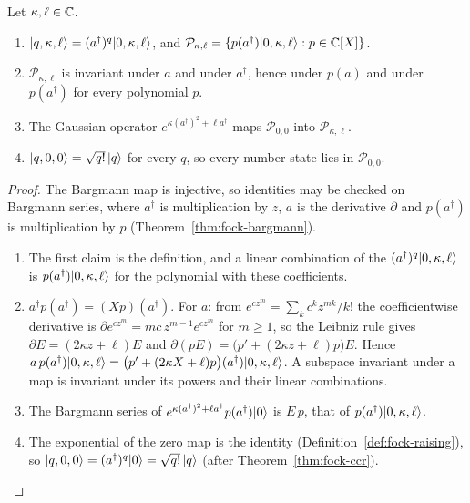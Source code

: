 \begin{vetbenv}
\begin{lemma}\label{lem:fock-photon}
Let $\kappa,\ell\in\mathbb C$.
\begin{enumerate}
\item[(a)] $\lvert q,\kappa,\ell\rangle=(a^\dagger)^q\lvert 0,\kappa,\ell\rangle$, and $\mathcal P_{\kappa,\ell}=\{p(a^\dagger)
\lvert 0,\kappa,\ell\rangle:p\in\mathbb C[X]\}$.
\item[(b)] $\mathcal P_{\kappa,\ell}$ is invariant under $a$ and under $a^\dagger$, hence under $p(a)$ and
under $p(a^\dagger)$ for every polynomial $p$.
\item[(c)] The Gaussian operator $e^{\kappa(a^\dagger)^2+\ell a^\dagger}$ maps $\mathcal P_{0,0}$ into
$\mathcal P_{\kappa,\ell}$.
\item[(d)] $\lvert q,0,0\rangle=\sqrt{q!}\,\lvert q\rangle$ for every $q$, so every number state lies in $\mathcal P_{0,0}$.
\end{enumerate}
\end{lemma}

\begin{proof}
The Bargmann map is injective, so identities may be checked on Bargmann series, where $a^\dagger$ is
multiplication by $z$, $a$ is the derivative $\partial$ and $p(a^\dagger)$ is multiplication by $p$
(Theorem~\ref{thm:fock-bargmann}).
\begin{enumerate}
\item[(a)] The first claim is the definition, and a linear combination of the $(a^\dagger)^q\lvert 0,\kappa,
\ell\rangle$ is $p(a^\dagger)\lvert 0,\kappa,\ell\rangle$ for the polynomial with these coefficients.
\item[(b)] $a^\dagger p(a^\dagger)=(Xp)(a^\dagger)$. For $a$: from $e^{cz^m}=\sum_kc^kz^{mk}/k!$ the
coefficientwise derivative is $\partial e^{cz^m}=mc\,z^{m-1}e^{cz^m}$ for $m\ge1$, so the Leibniz rule gives
$\partial E=(2\kappa z+\ell)E$ and $\partial(pE)=\bigl(p'+(2\kappa z+\ell)p\bigr)E$. Hence $a\,p(a^\dagger)
\lvert 0,\kappa,\ell\rangle=\bigl(p'+(2\kappa X+\ell)p\bigr)(a^\dagger)\lvert 0,\kappa,\ell\rangle$. A subspace invariant under
a map is invariant under its powers and their linear combinations.
\item[(c)] The Bargmann series of $e^{\kappa(a^\dagger)^2+\ell a^\dagger}p(a^\dagger)\lvert 0\rangle$ is $E\,p$, that of
$p(a^\dagger)\lvert 0,\kappa,\ell\rangle$.
\item[(d)] The exponential of the zero map is the identity (Definition~\ref{def:fock-raising}), so
$\lvert q,0,0\rangle=(a^\dagger)^q\lvert 0\rangle=\sqrt{q!}\,\lvert q\rangle$ (after Theorem~\ref{thm:fock-ccr}).\qedhere
\end{enumerate}
\end{proof}


\end{vetbenv}
